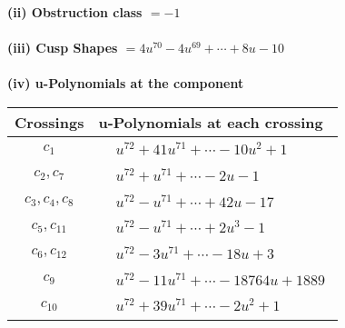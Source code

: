 \documentclass[1p]{elsarticle_modified}
\theoremstyle{definition}
\begin{document}
\flushleft \textbf{(ii) Obstruction class $= -1$}\\~\\
\flushleft \textbf{(iii) Cusp Shapes $= 4 u^{70}-4 u^{69}+\cdots+8 u-10$}\\~\\
\newpage\renewcommand{\arraystretch}{1}
\flushleft \textbf{(iv) u-Polynomials at the component}\newline \\
\begin{tabular}{m{50pt}|m{274pt}}
Crossings & \hspace{64pt}u-Polynomials at each crossing \\
\hline $$\begin{aligned}c_{1}\end{aligned}$$&$\begin{aligned}
&u^{72}+41 u^{71}+\cdots-10 u^2+1
\end{aligned}$\\
\hline $$\begin{aligned}c_{2},c_{7}\end{aligned}$$&$\begin{aligned}
&u^{72}+u^{71}+\cdots-2 u-1
\end{aligned}$\\
\hline $$\begin{aligned}c_{3},c_{4},c_{8}\end{aligned}$$&$\begin{aligned}
&u^{72}- u^{71}+\cdots+42 u-17
\end{aligned}$\\
\hline $$\begin{aligned}c_{5},c_{11}\end{aligned}$$&$\begin{aligned}
&u^{72}- u^{71}+\cdots+2 u^3-1
\end{aligned}$\\
\hline $$\begin{aligned}c_{6},c_{12}\end{aligned}$$&$\begin{aligned}
&u^{72}-3 u^{71}+\cdots-18 u+3
\end{aligned}$\\
\hline $$\begin{aligned}c_{9}\end{aligned}$$&$\begin{aligned}
&u^{72}-11 u^{71}+\cdots-18764 u+1889
\end{aligned}$\\
\hline $$\begin{aligned}c_{10}\end{aligned}$$&$\begin{aligned}
&u^{72}+39 u^{71}+\cdots-2 u^2+1
\end{aligned}$\\
\hline
\end{tabular}\\~\\
\end{document}
